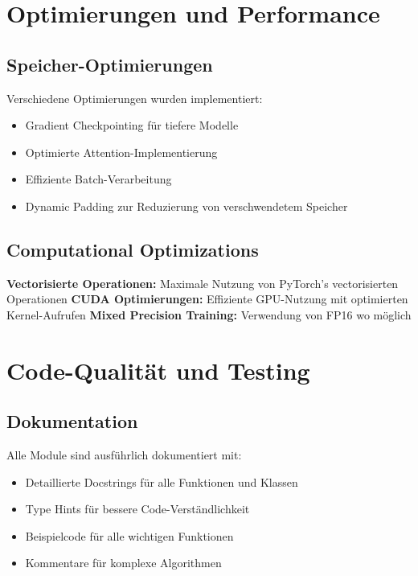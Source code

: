 \section{Optimierungen und Performance}

\subsection{Speicher-Optimierungen}

Verschiedene Optimierungen wurden implementiert:
\begin{itemize}
    \item Gradient Checkpointing für tiefere Modelle
    \item Optimierte Attention-Implementierung
    \item Effiziente Batch-Verarbeitung
    \item Dynamic Padding zur Reduzierung von verschwendetem Speicher
\end{itemize}

\subsection{Computational Optimizations}

\textbf{Vectorisierte Operationen:} Maximale Nutzung von PyTorch's vectorisierten Operationen
\textbf{CUDA Optimierungen:} Effiziente GPU-Nutzung mit optimierten Kernel-Aufrufen
\textbf{Mixed Precision Training:} Verwendung von FP16 wo möglich

\section{Code-Qualität und Testing}

\subsection{Dokumentation}

Alle Module sind ausführlich dokumentiert mit:
\begin{itemize}
    \item Detaillierte Docstrings für alle Funktionen und Klassen
    \item Type Hints für bessere Code-Verständlichkeit
    \item Beispielcode für alle wichtigen Funktionen
    \item Kommentare für komplexe Algorithmen
\end{itemize}

